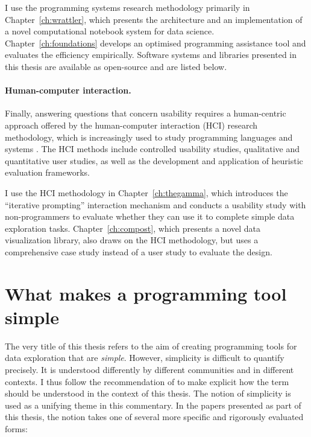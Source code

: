 \documentclass[fleqn,11pt]{report}
\theoremstyle{definition}
\begin{document}
I use the programming systems research methodology primarily in Chapter~\ref{ch:wrattler}, which
presents the architecture and an implementation of a novel computational notebook system for data
science. Chapter~\ref{ch:foundations} develops an optimised programming assistance tool and
evaluates the efficiency empirically. Software systems and libraries presented in this thesis
are available as open-source and are listed below.

\vspace{-0.34em}
\paragraph{Human-computer interaction.}
Finally, answering questions that concern usability requires a human-centric approach offered by
the human-computer interaction (HCI) research methodology, which is increasingly used to study
programming languages and systems \citep{chasins-2021-plhci}. The HCI methods include controlled
usability studies, qualitative and quantitative user studies, as well as the development and
application of heuristic evaluation frameworks.

I use the HCI methodology in Chapter~\ref{ch:thegamma}, which introduces the ``iterative prompting''
interaction mechanism and conducts a usability study with non-programmers to evaluate whether
they can use it to complete simple data exploration tasks. Chapter~\ref{ch:compost}, which
presents a novel data visualization library, also draws on the HCI methodology, but uses a
comprehensive case study instead of a user study to evaluate the design.

\section{What makes a programming tool simple}

The very title of this thesis refers to the aim of creating programming tools for data exploration
that are \emph{simple}. However, simplicity is difficult to quantify precisely. It is understood
differently by different communities and in different contexts. I thus follow the recommendation
of \citet{muller-2020-rhetoric} to make explicit how the term should be understood in the
context of this thesis. The notion of simplicity is used as a unifying theme in this commentary.
In the papers presented as part of this thesis, the notion takes one of several more specific and
rigorously evaluated forms:
\end{document}
